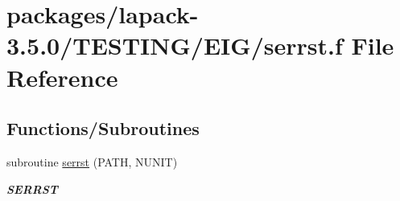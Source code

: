 \hypertarget{serrst_8f}{}\section{packages/lapack-\/3.5.0/\+T\+E\+S\+T\+I\+N\+G/\+E\+I\+G/serrst.f File Reference}
\label{serrst_8f}
\subsection*{Functions/\+Subroutines}
\begin{DoxyCompactItemize}
\item 
subroutine \hyperlink{group__single__eig_gae70b9c462a9febd73364f58aa8f4ad81}{serrst} (P\+A\+T\+H, N\+U\+N\+I\+T)
\begin{DoxyCompactList}\small\item\em {\bfseries S\+E\+R\+R\+S\+T} \end{DoxyCompactList}\end{DoxyCompactItemize}
